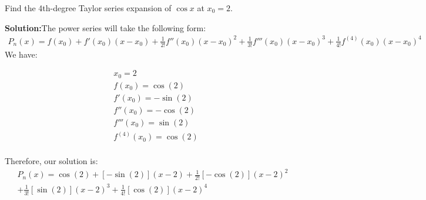 \begin{exmp}{}
Find the 4th-degree Taylor series expansion of $\cos x$ at $x_0=2$.

\textbf{Solution:}The power series will take the following form:
\begin{align*}
P_n(x)=f(x_0)+ f'(x_0)(x-x_0)+ \frac{1}{2!}f''(x_0)(x-x_0)^2+ \frac{1}{3!}f'''(x_0)(x-x_0)^3+ \frac{1}{4!}f^{(4)}(x_0)(x-x_0)^4
\end{align*}
We have:

\begin{align*}
&x_0=2\\
&f(x_0)=\cos(2)\\
&f'(x_0)=-\sin(2)\\
&f''(x_0)=-\cos(2)\\
&f'''(x_0)=\sin(2)\\
&f^{(4)}(x_0)=\cos(2)\\
\end{align*}

Therefore, our solution is:
\begin{align*}
P_n(x)=\cos (2)+ [-\sin(2)](x-2)+ \frac{1}{2!}[-\cos(2)](x-2)^2\\+ \frac{1}{3!}[\sin(2)](x-2)^3+ \frac{1}{4!}[\cos(2)](x-2)^4
\end{align*}
\end{exmp}

